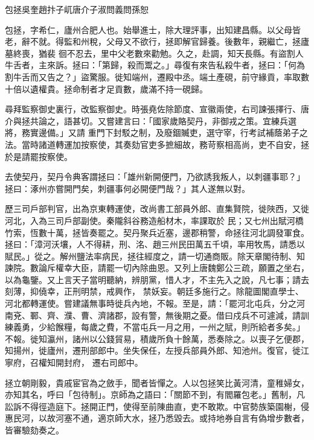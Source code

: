 
\begin{pinyinscope}

 包拯吳奎趙抃子屼唐介子淑問義問孫恕



 包拯，字希仁，廬州合肥人也。始舉進士，除大理評事，出知建昌縣。以父母皆老，辭不就。得監和州稅，父母又不欲行，拯即解官歸養。後數年，親繼亡，拯廬墓終喪，猶裴
 徊不忍去，里中父老數來勸勉。久之，赴調，知天長縣。有盜割人牛舌者，主來訴。拯曰：「第歸，殺而鬻之。」尋復有來告私殺牛者，拯曰：「何為割牛舌而又告之？」盜驚服。徙知端州，遷殿中丞。端土產硯，前守緣貢，率取數十倍以遺權貴。拯命制者才足貢數，歲滿不持一硯歸。



 尋拜監察御史裏行，改監察御史。時張堯佐除節度、宣徽兩使，右司諫張擇行、唐介與拯共論之，語甚切。又嘗建言曰：「國家歲賂契丹，非御戎之策。宜練兵選將，務實邊備。」又請
 重門下封駁之制，及廢錮贓吏，選守宰，行考試補蔭弟子之法。當時諸道轉運加按察使，其奏劾官吏多摭細故，務苛察相高尚，吏不自安，拯於是請罷按察使。



 去使契丹，契丹令典客謂拯曰：「雄州新開便門，乃欲誘我叛人，以刺疆事耶？」拯曰：涿州亦嘗開門矣，刺疆事何必開便門哉？」其人遂無以對。



 歷三司戶部判官，出為京東轉運使，改尚書工部員外郎、直集賢院，徙陜西，又徙河北，入為三司戶部副使。秦隴斜谷務造船材木，率課取於
 民；又七州出賦河橋竹索，恆數十萬，拯皆奏罷之。契丹聚兵近塞，邊郡稍警，命拯往河北調發軍食。拯曰：「漳河沃壤，人不得耕，刑、洺、趙三州民田萬五千頃，率用牧馬，請悉以賦民。」從之。解州鹽法率病民，拯往經度之，請一切通商販。除天章閣待制、知諫院。數論斥權幸大臣，請罷一切內除曲恩。又列上唐魏鄭公三疏，願置之坐右，以為龜鑒。又上言天子當明聽納，辨朋黨，惜人才，不主先入之說，凡七事；請去刻薄，抑僥幸，正刑明禁，戒興作，
 禁妖妄。朝廷多施行之。除龍圖閣直學士、河北都轉運使。嘗建議無事時徙兵內地，不報。至是，請：「罷河北屯兵，分之河南兗、鄆、齊、濮、曹、濟諸郡，設有警，無後期之憂。借曰戍兵不可遽減，請訓練義勇，少給餱糧，每歲之費，不當屯兵一月之用，一州之賦，則所給者多矣。」不報。徙知瀛州，諸州以公錢貿易，積歲所負十餘萬，悉奏除之。以喪子乞便郡，知揚州，徙廬州，遷刑部郎中。坐失保任，左授兵部員外郎、知池州。復官，徙江寧府，召權知開封府，
 遷右司郎中。



 拯立朝剛毅，貴戚宦官為之斂手，聞者皆憚之。人以包拯笑比黃河清，童稚婦女，亦知其名，呼曰「包待制」。京師為之語曰：「關節不到，有閻羅包老。」舊制，凡訟訴不得徑造庭下。拯開正門，使得至前陳曲直，吏不敢欺。中官勢族築園榭，侵惠民河，以故河塞不通，適京師大水，拯乃悉毀去。或持地券自言有偽增步數者，皆審驗劾奏之。




\end{pinyinscope}
